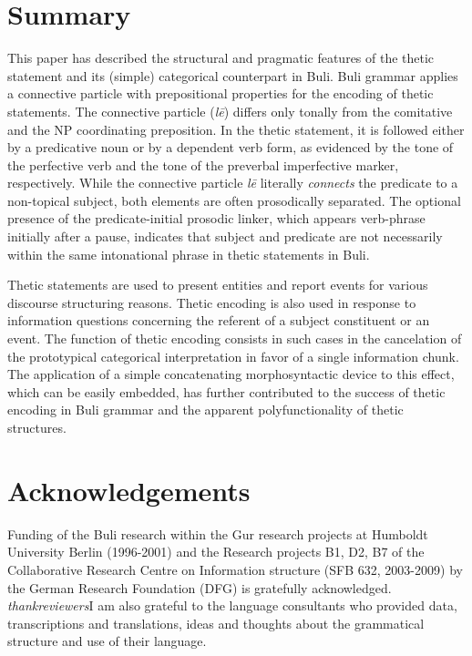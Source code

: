 \documentclass[output=paper]{langsci/langscibook}
\begin{document}
\section{Summary} %

This paper has described the structural and pragmatic features of the thetic statement and its (simple) categorical counterpart in Buli. Buli grammar applies a connective particle with prepositional properties for the encoding of thetic statements. The connective particle (\textit{l\={e}})\textit{ }differs only tonally from the comitative and the NP coordinating preposition. In the thetic statement, it is followed either by a predicative noun or by a dependent verb form, as evidenced by the tone of the perfective verb and the tone of the preverbal imperfective marker, respectively. While the connective particle\textit{ l\={e} }literally \textit{connects} the predicate to a non-topical subject, both elements are often prosodically separated. The optional presence of the predicate-initial prosodic linker, which appears verb-phrase initially after a pause, indicates that subject and predicate are not necessarily within the same intonational phrase in thetic statements in Buli. 

Thetic statements are used to present entities and report events for various discourse structuring reasons. Thetic encoding is also used in response to information questions concerning the referent of a subject constituent or an event. The function of thetic encoding consists in such cases in the cancelation of the prototypical categorical interpretation in favor of a single information chunk. The application of a simple concatenating morphosyntactic device to this effect, which can be easily embedded, has further contributed to the success of thetic encoding in Buli grammar and the apparent polyfunctionality of thetic structures. 

\section*{ Acknowledgements }

Funding of the Buli research within the Gur research projects at Humboldt University Berlin (1996-2001) and the Research projects B1, D2, B7 of the Collaborative Research Centre on Information structure (SFB 632, 2003-2009) by the German Research Foundation (DFG) is gratefully acknowledged. \emph{\textup{thank}}\emph{\textup{reviewers}}I am also grateful to the language consultants who provided data, transcriptions and translations, ideas and thoughts about the grammatical structure and use of their language.
\end{document}
